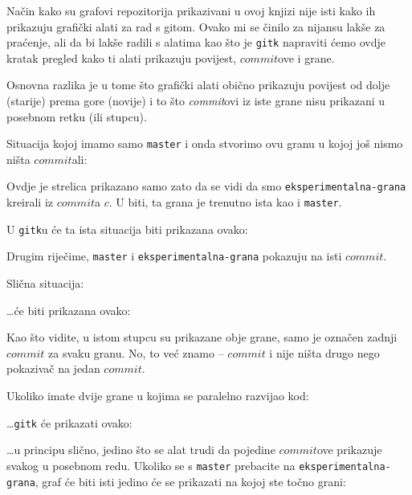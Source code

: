 
Način kako su grafovi repozitorija prikazivani u ovoj knjizi nije isti kako ih prikazuju grafički alati za rad s gitom.
Ovako mi se činilo za nijansu lakše za praćenje, ali da bi lakše radili s alatima kao što je \verb+gitk+ napraviti ćemo ovdje kratak pregled kako ti alati prikazuju povijest, $commit$ove i grane.

Osnovna razlika je u tome što grafički alati obično prikazuju povijest od dolje (starije) prema gore (novije)
i to što \emph{commit}ovi iz iste grane nisu prikazani u posebnom retku (ili stupcu).


Situacija kojoj imamo samo \verb+master+ i onda stvorimo ovu granu u kojoj još nismo ništa $commit$ali:



Ovdje je strelica prikazano samo zato da se vidi da smo \verb+eksperimentalna-grana+ kreirali iz $commit$a $c$.
U biti, ta grana je trenutno ista kao i \verb+master+.

U \verb+gitk+u će ta ista situacija biti prikazana ovako:


Drugim riječime, \verb+master+ i \verb+eksperimentalna-grana+ pokazuju na isti $commit$.

Slična situacija:



\dots{}će biti prikazana ovako:


Kao što vidite, u istom stupcu su prikazane obje grane, samo je označen zadnji $commit$ za svaku granu.
No, to već znamo -- $commit$ i nije ništa drugo nego pokazivač na jedan $commit$.

Ukoliko imate dvije grane u kojima se paralelno razvijao kod:



\dots{}\verb+gitk+ će prikazati ovako:


\dots{}u principu slično, jedino što se alat trudi da pojedine $commit$ove prikazuje svakog u posebnom redu.
Ukoliko se s \verb+master+ prebacite na \verb+eksperimentalna-grana+, graf će biti isti jedino će se prikazati na kojoj ste točno grani:

